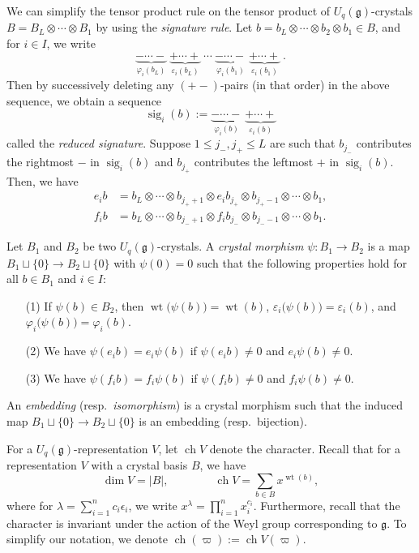 \documentclass[11pt, leqno]{amsart}
\theoremstyle{plain}
\theoremstyle{definition}
\numberwithin{equation}{section}
\newcommand{\g}{\mathfrak{g}}
\newcommand{\fw}{\varpi} %
\newcommand{\seteq}{\mathbin{:=}}
\newcommand{\wt}{\operatorname{wt}} %
\newcommand{\sig}{\operatorname{sig}} %
\newcommand{\ch}{\operatorname{ch}} %
\newcommand{\defn}[1]{{\color{darkred}\emph{#1}}} %
\begin{document}
We can simplify the tensor product rule on the tensor product of $U_q(\g)$-crystals $B = B_L \otimes \dotsm \otimes B_1$ by using the \defn{signature rule}. Let $b = b_L \otimes \cdots \otimes b_2 \otimes b_1 \in B$, and for $i \in I$, we write
\[
\underbrace{-\cdots-}_{\varphi_i(b_L)}\
\underbrace{+\cdots+}_{\varepsilon_i(b_L)}\
\cdots\
\underbrace{-\cdots-}_{\varphi_i(b_1)}\
\underbrace{+\cdots+}_{\varepsilon_i(b_1)}\ .
\]
Then by successively deleting any $(+-)$-pairs (in that order) in the above sequence, we obtain a sequence
\[
\sig_i(b) \seteq
\underbrace{-\cdots-}_{\varphi_i(b)}\
\underbrace{+\cdots+}_{\varepsilon_i(b)}
\]
called the \defn{reduced signature}. Suppose $1 \leq j_-, j_+ \leq L$ are such that $b_{j_-}$ contributes the rightmost $-$ in $\sig_i(b)$ and $b_{j_+}$ contributes the leftmost $+$ in $\sig_i(b)$.
Then, we have
\begin{align*}
e_i b &= b_L \otimes \cdots \otimes b_{j_++1} \otimes e_ib_{j_+} \otimes b_{j_+-1} \otimes \cdots \otimes b_1, \\
f_i b &= b_L \otimes \cdots \otimes b_{j_-+1} \otimes f_ib_{j_-} \otimes b_{j_--1} \otimes \cdots \otimes b_1.
\end{align*}

Let $B_1$ and $B_2$ be two $U_q(\g)$-crystals.
A \defn{crystal morphism} $\psi \colon B_1 \to B_2$ is a map $B_1 \sqcup \{0\} \to B_2 \sqcup \{0\}$ with $\psi(0) = 0$ such that the following properties hold for all $b \in B_1$ and $i \in I$:
\begin{itemize}
\item[(1)] If $\psi(b) \in B_2$, then $\wt\bigl(\psi(b)\bigr) = \wt(b)$, $\varepsilon_i\bigl(\psi(b)\bigr) = \varepsilon_i(b)$, and $\varphi_i\bigl(\psi(b)\bigr) = \varphi_i(b)$.
\item[(2)] We have $\psi(e_i b) = e_i \psi(b)$ if $\psi(e_i b) \neq 0$ and $e_i \psi(b) \neq 0$.
\item[(3)] We have $\psi(f_i b) = f_i \psi(b)$ if $\psi(f_i b) \neq 0$ and $f_i \psi(b) \neq 0$.
\end{itemize}
An \defn{embedding} (resp.~\defn{isomorphism}) is a crystal morphism such that the induced map $B_1 \sqcup \{0\} \to B_2 \sqcup \{0\}$ is an embedding (resp.~bijection).

For a $U_q(\g)$-representation $V$, let $\ch V$ denote the character.
Recall that for a representation $V$ with a crystal basis $B$, we have
\[
\dim V = \lvert B \rvert,
\qquad\qquad
\ch V = \sum_{b \in B} x^{\wt(b)},
\]
where for $\lambda = \sum_{i=1}^n c_i \epsilon_i$, we write $x^{\lambda} = \prod_{i=1}^n x_i^{c_i}$. Furthermore, recall that the character is invariant under the action of the Weyl group corresponding to $\g$.
To simplify our notation, we denote $\ch(\fw) \seteq \ch V(\fw)$.
\end{document}
